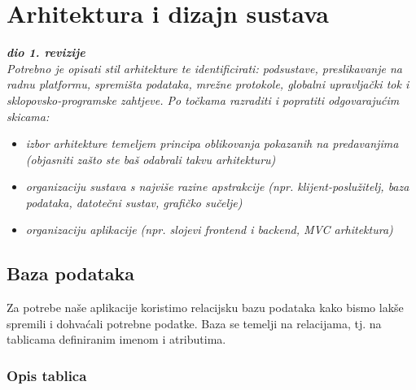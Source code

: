 \chapter{Arhitektura i dizajn sustava}
		
		\textbf{\textit{dio 1. revizije}}\\

		\textit{ Potrebno je opisati stil arhitekture te identificirati: podsustave, preslikavanje na radnu platformu, spremišta podataka, mrežne protokole, globalni upravljački tok i sklopovsko-programske zahtjeve. Po točkama razraditi i popratiti odgovarajućim skicama:}
	\begin{itemize}
		\item 	\textit{izbor arhitekture temeljem principa oblikovanja pokazanih na predavanjima (objasniti zašto ste baš odabrali takvu arhitekturu)}
		\item 	\textit{organizaciju sustava s najviše razine apstrakcije (npr. klijent-poslužitelj, baza podataka, datotečni sustav, grafičko sučelje)}
		\item 	\textit{organizaciju aplikacije (npr. slojevi frontend i backend, MVC arhitektura) }		
	\end{itemize}

	
		

		

				
		\section{Baza podataka}
		
		
		Za potrebe naše aplikacije koristimo relacijsku bazu podataka kako bismo lakše spremili i dohvaćali potrebne podatke. Baza se temelji na relacijama, tj. na tablicama definiranim imenom i atributima.
		
		\subsection{Opis tablica}
		
